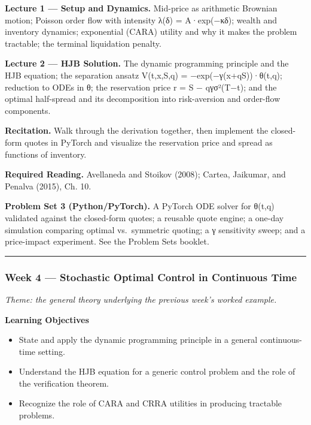 \documentclass[
]{article}
\providecommand{\tightlist}{%
  \setlength{\itemsep}{0pt}\setlength{\parskip}{0pt}}
\begin{document}
\textbf{Lecture 1 --- Setup and Dynamics.} Mid-price as arithmetic
Brownian motion; Poisson order flow with intensity λ(δ) = A·exp(−κδ);
wealth and inventory dynamics; exponential (CARA) utility and why it
makes the problem tractable; the terminal liquidation penalty.

\textbf{Lecture 2 --- HJB Solution.} The dynamic programming principle
and the HJB equation; the separation ansatz V(t,x,S,q) =
−exp(−γ(x+qS))·θ(t,q); reduction to ODEs in θ; the reservation price r =
S − qγσ²(T−t); and the optimal half-spread and its decomposition into
risk-aversion and order-flow components.

\textbf{Recitation.} Walk through the derivation together, then
implement the closed-form quotes in PyTorch and visualize the
reservation price and spread as functions of inventory.

\textbf{Required Reading.} Avellaneda and Stoikov (2008); Cartea,
Jaikumar, and Penalva (2015), Ch. 10.

\textbf{Problem Set 3 (Python/PyTorch).} A PyTorch ODE solver for θ(t,q)
validated against the closed-form quotes; a reusable quote engine; a
one-day simulation comparing optimal vs.~symmetric quoting; a γ
sensitivity sweep; and a price-impact experiment. See the Problem Sets
booklet.

\begin{center}\rule{0.5\linewidth}{0.5pt}\end{center}

\subsubsection{Week 4 --- Stochastic Optimal Control in Continuous
Time}\label{week-4-stochastic-optimal-control-in-continuous-time}

\emph{Theme: the general theory underlying the previous week's worked
example.}

\textbf{Learning Objectives}

\begin{itemize}
\tightlist
\item
  State and apply the dynamic programming principle in a general
  continuous-time setting.
\item
  Understand the HJB equation for a generic control problem and the role
  of the verification theorem.
\item
  Recognize the role of CARA and CRRA utilities in producing tractable
  problems.
\end{itemize}
\end{document}
